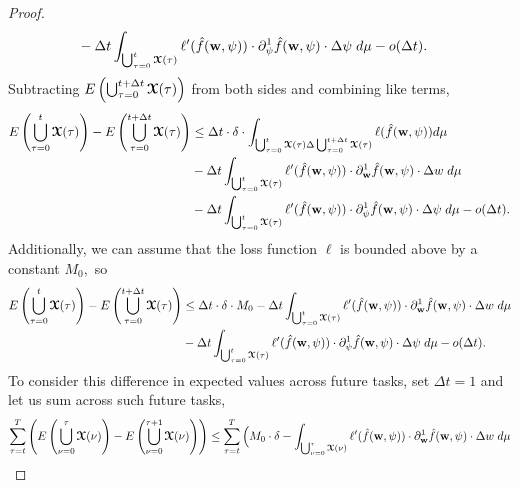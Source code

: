 \begin{proof}
\begin{align*}
        & -\Delta t \displaystyle\int_{\bigcup_{\tau = 0}^{t}\boldsymbol{\mathcal{X}}(\tau)} \ell'(\hat{f}(\boldsymbol{\mathrm{w}},\psi))\cdot \partial_{\psi}^1 \hat{f}(\boldsymbol{\mathrm{w}},\psi)\cdot \Delta \psi \hspace{1mm}  d\mu- o(\Delta t).
    \end{align*}
    Subtracting $E\left(\bigcup_{\tau = 0}^{t+\Delta t}\boldsymbol{\mathcal{X}}(\tau)\right)$ from both sides and combining like terms,
    \begin{align*}
         E\left(\bigcup_{\tau = 0}^{t}\boldsymbol{\mathcal{X}}(\tau)\right) - E\left(\bigcup_{\tau = 0}^{t+\Delta t}\boldsymbol{\mathcal{X}}(\tau)\right)
         & \leq \Delta t \cdot \delta \cdot \displaystyle\int_{\bigcup_{\tau = 0}^{t}\boldsymbol{\mathcal{X}}(\tau)\Delta \bigcup_{\tau = 0}^{t+\Delta t}\boldsymbol{\mathcal{X}}(\tau)} \ell(\hat{f}(\boldsymbol{\mathrm{w}},\psi))d\mu\\
        & - \Delta t\displaystyle\int_{\bigcup_{\tau = 0}^{t}\boldsymbol{\mathcal{X}}(\tau)} \ell'(\hat{f}(\boldsymbol{\mathrm{w}},\psi))\cdot \partial_{\boldsymbol{\mathrm{w}}}^1 \hat{f}(\boldsymbol{\mathrm{w}},\psi)\cdot \Delta w \hspace{1mm}  d\mu\\
        & -\Delta t \displaystyle\int_{\bigcup_{\tau = 0}^{t}\boldsymbol{\mathcal{X}}(\tau)} \ell'(\hat{f}(\boldsymbol{\mathrm{w}},\psi))\cdot \partial_{\psi}^1 \hat{f}(\boldsymbol{\mathrm{w}},\psi)\cdot \Delta \psi \hspace{1mm}  d\mu- o(\Delta t).
    \end{align*}
    Additionally, we can assume that the loss function $\ell$ is bounded above by a constant $M_0,$ so
    \begin{align*}
        E\left(\bigcup_{\tau = 0}^{t}\boldsymbol{\mathcal{X}}(\tau)\right) - E\left(\bigcup_{\tau = 0}^{t+\Delta t}\boldsymbol{\mathcal{X}}(\tau)\right)
        & \leq \Delta t \cdot \delta \cdot M_0- \Delta t\displaystyle\int_{\bigcup_{\tau = 0}^{t}\boldsymbol{\mathcal{X}}(\tau)} \ell'(\hat{f}(\boldsymbol{\mathrm{w}},\psi))\cdot \partial_{\boldsymbol{\mathrm{w}}}^1 \hat{f}(\boldsymbol{\mathrm{w}},\psi)\cdot \Delta w \hspace{1mm}  d\mu\\
        & -\Delta t \displaystyle\int_{\bigcup_{\tau = 0}^{t}\boldsymbol{\mathcal{X}}(\tau)} \ell'(\hat{f}(\boldsymbol{\mathrm{w}},\psi))\cdot \partial_{\psi}^1 \hat{f}(\boldsymbol{\mathrm{w}},\psi)\cdot \Delta \psi \hspace{1mm}  d\mu- o(\Delta t).
    \end{align*}
    To consider this difference in expected values across future tasks, set $\Delta t =1 $ and let us sum across such future tasks, 
    \begin{align*}
         \sum_{\tau = t}^{T} \left(E\left(\bigcup_{\nu = 0}^{\tau}\tx(\nu)\right) - E\left(\bigcup_{\nu = 0}^{\tau+1}\tx(\nu)\right)\right)
        & \leq \sum_{\tau =t}^{T} \Big( M_0\cdot \delta - \displaystyle\int_{\bigcup_{\nu = 0}^{\tau}\tx(\nu)} \ell'(\hat{f}(\weight,\psi))\cdot \partial_{\weight}^1 \hat{f}(\weight,\psi)\cdot \Delta w \hspace{1mm}  d\mu\\

\end{align*}
\end{proof}
